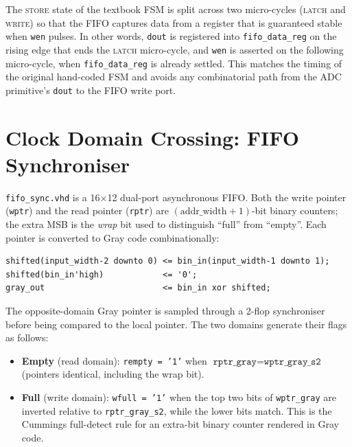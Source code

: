 \documentclass[12pt,letterpaper]{article}
\begin{document}
The \textsc{store} state of the textbook FSM is split across two micro-cycles
(\textsc{latch} and \textsc{write}) so that the FIFO captures data from a
register that is guaranteed stable when \texttt{wen} pulses.  In other words,
\texttt{dout} is registered into \texttt{fifo\_data\_reg} on the rising edge
that ends the \textsc{latch} micro-cycle, and \texttt{wen} is asserted on the
following micro-cycle, when \texttt{fifo\_data\_reg} is already settled.  This
matches the timing of the original hand-coded FSM and avoids any
combinatorial path from the ADC primitive's \texttt{dout} to the FIFO write
port.

\section{Clock Domain Crossing: FIFO Synchroniser}
\label{sec:fifo}

\texttt{fifo\_sync.vhd} is a 16$\times$12 dual-port asynchronous FIFO.  Both the
write pointer (\texttt{wptr}) and the read pointer (\texttt{rptr}) are
\((\text{addr\_width}+1)\)-bit binary counters; the extra MSB is the
\emph{wrap} bit used to distinguish ``full'' from ``empty''.  Each pointer is
converted to Gray code combinationally:

\begin{lstlisting}[caption={Binary-to-Gray converter (\texttt{bin\_to\_gray.vhd}).}]
shifted(input_width-2 downto 0) <= bin_in(input_width-1 downto 1);
shifted(bin_in'high)            <= '0';
gray_out                        <= bin_in xor shifted;
\end{lstlisting}

The opposite-domain Gray pointer is sampled through a 2-flop
synchroniser before being compared to the local pointer.  The two domains
generate their flags as follows:

\begin{itemize}
  \item \textbf{Empty} (read domain): \texttt{rempty = '1'} when
        \(\texttt{rptr\_gray} = \texttt{wptr\_gray\_s2}\) (pointers identical,
        including the wrap bit).
  \item \textbf{Full} (write domain): \texttt{wfull = '1'} when the top two
        bits of \texttt{wptr\_gray} are inverted relative to
        \texttt{rptr\_gray\_s2}, while the lower bits match.  This is the
        Cummings full-detect rule for an extra-bit binary counter rendered in
        Gray code.
\end{itemize}
\end{document}
